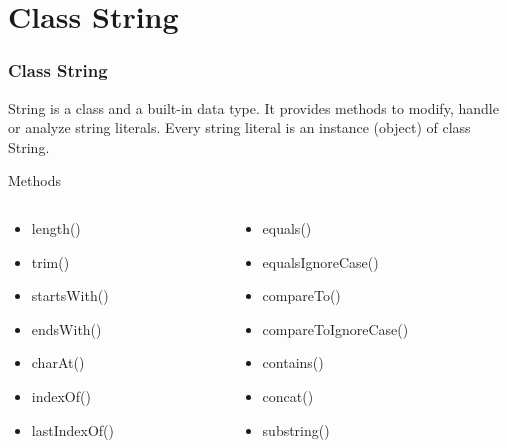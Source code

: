 \documentclass[10pt, compress]{beamer}
\begin{document}
\section{Class String}

\begin{frame}[fragile]
	\frametitle{Class String}
	String is a class and a built-in data type. It provides methods to modify, handle or analyze string literals. Every string literal is an instance (object) of class String.
	\begin{block}{Methods}
		\begin{columns}
			\begin{column}{0.5\textwidth}
				\begin{itemize}
					\item[] length()
					\item[] trim()
					\item[] startsWith()
					\item[] endsWith()
					\item[] charAt()
					\item[] indexOf()
					\item[] lastIndexOf()
				\end{itemize}
			\end{column}
			\begin{column}{0.5\textwidth}
				\begin{itemize}
					\item[] equals()
					\item[] equalsIgnoreCase()
					\item[] compareTo()
					\item[] compareToIgnoreCase()
					\item[] contains()
					\item[] concat()
					\item[] substring()
				\end{itemize}
			\end{column}
		\end{columns}
	\end{block}
\end{frame}
\end{document}
